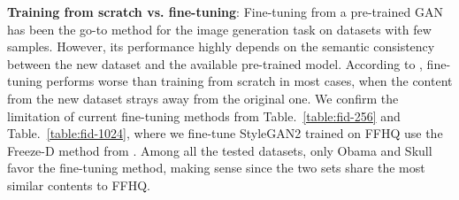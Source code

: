 \documentclass{article} \usepackage{iclr2021_conference,times}
\begin{document}
\begin{table}[h]
\vspace{-0mm}
\caption{FID comparison at  resolution on few-sample datasets.}
\label{table:fid-256}
\vspace{-2mm}
\begin{center}
\end{center}
\vspace{-2mm}
\end{table}

\textbf{Training from scratch vs. fine-tuning}: Fine-tuning from a pre-trained GAN \citep{mo2020freeze,noguchi2019image,wang2020minegan} has been the go-to method for the image generation task on datasets with few samples. However, its performance highly depends on the semantic consistency between the new dataset and the available pre-trained model. According to \citeauthor{zhao2020differentiable}, fine-tuning performs worse than training from scratch in most cases, when the content from the new dataset strays away from the original one. We confirm the limitation of current fine-tuning methods from Table.~\ref{table:fid-256} and Table.~\ref{table:fid-1024}, where we fine-tune StyleGAN2 trained on FFHQ use the Freeze-D method from \citeauthor{mo2020freeze}. Among all the tested datasets, only Obama and Skull favor the fine-tuning method, making sense since the two sets share the most similar contents to FFHQ.
\end{document}
